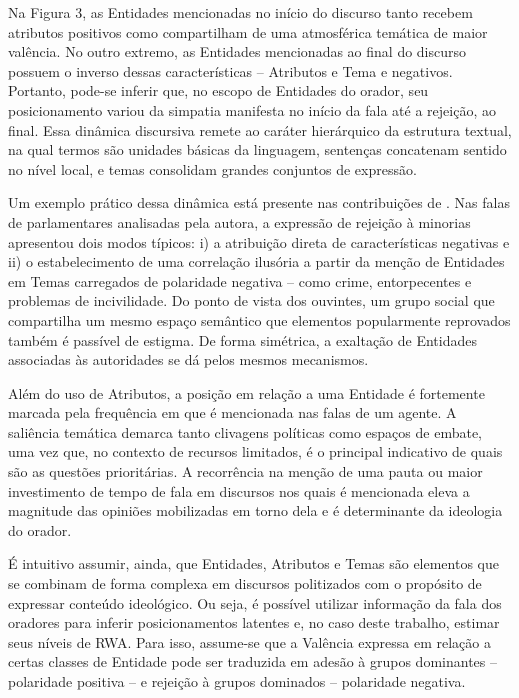 \documentclass[
12pt,				%
openright,			%
twoside,			%
a4paper,			%
english,			%
french,				%
spanish,			%
brazil				%
]{abntex2}
\begin{document}
Na Figura 3, as Entidades mencionadas no início do discurso tanto recebem atributos positivos como compartilham de uma atmosférica temática de maior valência. No outro extremo, as Entidades mencionadas ao final do discurso possuem o inverso dessas características -- Atributos e Tema e negativos. Portanto, pode-se inferir que, no escopo de Entidades do orador, seu posicionamento variou da simpatia manifesta no início da fala até a rejeição, ao final. Essa dinâmica discursiva remete ao caráter hierárquico da estrutura textual, na qual termos são unidades básicas da linguagem, sentenças concatenam sentido no nível local, e temas consolidam grandes conjuntos de expressão.    

Um exemplo prático dessa dinâmica está presente nas contribuições de . Nas falas de parlamentares analisadas pela autora, a expressão de rejeição à minorias apresentou dois modos típicos: i) a atribuição direta de características negativas e ii) o estabelecimento de uma correlação ilusória a partir da menção de Entidades em Temas carregados de polaridade negativa -- como crime, entorpecentes e problemas de incivilidade. Do ponto de vista dos ouvintes, um grupo social que compartilha um mesmo espaço semântico que elementos popularmente reprovados também é passível de estigma. De forma simétrica, a exaltação de Entidades associadas às autoridades se dá pelos mesmos mecanismos.

Além do uso de Atributos, a posição em relação a uma Entidade é fortemente marcada pela frequência em que é mencionada nas falas de um agente. A saliência temática demarca tanto clivagens políticas como espaços de embate, uma vez que, no contexto de recursos limitados, é o principal indicativo de quais são as questões prioritárias. A recorrência na menção de uma pauta ou maior investimento de tempo de fala em discursos nos quais é mencionada eleva a magnitude das opiniões mobilizadas em torno dela e é determinante da ideologia do orador.

É intuitivo assumir, ainda, que Entidades, Atributos e Temas são elementos que se combinam de forma complexa em discursos politizados com o propósito de expressar conteúdo ideológico. Ou seja, é possível utilizar informação da fala dos oradores para inferir posicionamentos latentes e, no caso deste trabalho, estimar seus níveis de RWA. Para isso, assume-se que a Valência expressa em relação a certas classes de Entidade pode ser traduzida em adesão à grupos dominantes -- polaridade positiva -- e rejeição à grupos dominados -- polaridade negativa.
\end{document}
